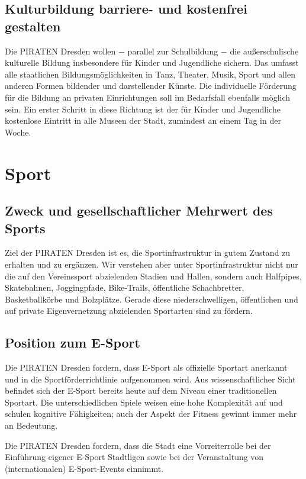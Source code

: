 \documentclass[a4paper, 11pt]{article}
\begin{document}
\subsection{Kulturbildung barriere- und kostenfrei gestalten}
Die PIRATEN Dresden wollen $-$ parallel zur Schulbildung $-$ die außerschulische kulturelle Bildung insbesondere für Kinder und Jugendliche sichern. Das umfasst alle staatlichen Bildungsmöglichkeiten in Tanz, Theater, Musik, Sport und allen anderen Formen bildender und darstellender Künste. Die individuelle Förderung für die Bildung an privaten Einrichtungen soll im Bedarfsfall ebenfalls möglich sein. Ein erster Schritt in diese Richtung ist der für Kinder und Jugendliche kostenlose Eintritt in alle Museen der Stadt, zumindest an einem Tag in der Woche.


\section{Sport}

\subsection{Zweck und gesellschaftlicher Mehrwert des Sports}
Ziel der PIRATEN Dresden ist es, die Sportinfrastruktur in gutem Zustand zu erhalten und zu ergänzen. Wir verstehen aber unter Sportinfrastruktur nicht nur die auf den Vereinssport abzielenden Stadien und Hallen, sondern auch Halfpipes, Skatebahnen, Joggingpfade, Bike-Trails, öffentliche Schachbretter, Basketballkörbe und Bolzplätze. Gerade diese niederschwelligen, öffentlichen und auf private Eigenvernetzung abzielenden Sportarten sind zu fördern.



\subsection{Position zum E-Sport}
Die PIRATEN Dresden fordern, dass E-Sport als offizielle Sportart anerkannt und in die Sportförderrichtlinie aufgenommen wird. Aus wissenschaftlicher Sicht befindet sich der E-Sport bereits heute auf dem Niveau einer traditionellen Sportart. Die unterschiedlichen Spiele weisen eine hohe Komplexität auf und schulen kognitive Fähigkeiten; auch der Aspekt der Fitness gewinnt immer mehr an Bedeutung.\newline

Die PIRATEN Dresden fordern, dass die Stadt eine Vorreiterrolle bei der Einführung eigener E-Sport Stadtligen sowie bei der Veranstaltung von (internationalen) E-Sport-Events einnimmt.
\end{document}
